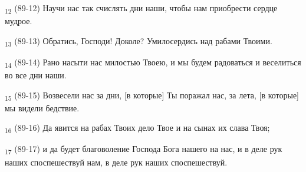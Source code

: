 \begin{tcolorbox}
\textsubscript{12} (89-12) Научи нас так счислять дни наши, чтобы нам приобрести сердце мудрое.
\end{tcolorbox}
\begin{tcolorbox}
\textsubscript{13} (89-13) Обратись, Господи! Доколе? Умилосердись над рабами Твоими.
\end{tcolorbox}
\begin{tcolorbox}
\textsubscript{14} (89-14) Рано насыти нас милостью Твоею, и мы будем радоваться и веселиться во все дни наши.
\end{tcolorbox}
\begin{tcolorbox}
\textsubscript{15} (89-15) Возвесели нас за дни, [в которые] Ты поражал нас, за лета, [в которые] мы видели бедствие.
\end{tcolorbox}
\begin{tcolorbox}
\textsubscript{16} (89-16) Да явится на рабах Твоих дело Твое и на сынах их слава Твоя;
\end{tcolorbox}
\begin{tcolorbox}
\textsubscript{17} (89-17) и да будет благоволение Господа Бога нашего на нас, и в деле рук наших споспешествуй нам, в деле рук наших споспешествуй.
\end{tcolorbox}
